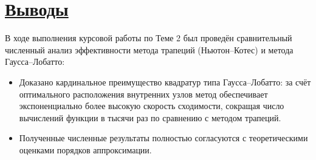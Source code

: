 \documentclass[14pt]{extarticle}
\begin{document}
	
	\newpage
	\section{\Large \underline{Выводы}}
	
	В ходе выполнения курсовой работы по Теме 2 был проведён сравнительный численный анализ эффективности метода трапеций (Ньютон–Котес) и метода Гаусса–Лобатто:
	
	\begin{itemize}
		\item Доказано кардинальное преимущество квадратур типа Гаусса–Лобатто: за счёт оптимального расположения внутренних узлов метод обеспечивает экспоненциально более высокую скорость сходимости, сокращая число вычислений функции в тысячи раз по сравнению с методом трапеций.
		\item Полученные численные результаты полностью согласуются с теоретическими оценками порядков аппроксимации.
	\end{itemize}
	
\end{document}
